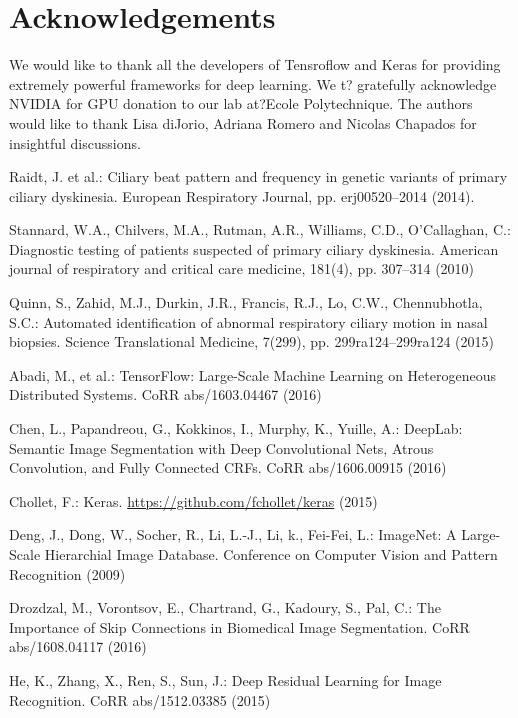 \documentclass{llncs}
\begin{document}
\section*{Acknowledgements}
We would like to thank all the developers of Tensroflow and Keras for providing extremely powerful  frameworks for deep learning.  We  t? gratefully  acknowledge  NVIDIA  for  GPU  donation to  our  lab  at?Ecole  Polytechnique.  The  authors  would  like  to  thank  Lisa  diJorio,  Adriana  Romero  and  Nicolas  Chapados  for  insightful  discussions.  

\begin{thebibliography}{26}

Raidt, J. et al.:
Ciliary beat pattern and frequency in genetic variants of primary ciliary dyskinesia.
European Respiratory Journal, pp. erj00520--2014 (2014).

Stannard, W.A., Chilvers, M.A., Rutman, A.R., Williams, C.D., O'Callaghan, C.:
Diagnostic testing of patients suspected of primary ciliary dyskinesia.
American journal of respiratory and critical care medicine, 181(4), pp. 307--314 (2010)

Quinn, S., Zahid, M.J., Durkin, J.R., Francis, R.J., Lo, C.W., Chennubhotla, S.C.:
Automated identification of abnormal respiratory ciliary motion in nasal biopsies.
Science Translational Medicine, 7(299), pp. 299ra124--299ra124 (2015)

Abadi, M., et al.:
TensorFlow: Large-Scale Machine Learning on Heterogeneous Distributed Systems.
CoRR abs/1603.04467 (2016)

Chen, L., Papandreou, G., Kokkinos, I., Murphy, K., Yuille, A.:
DeepLab: Semantic Image Segmentation with Deep Convolutional Nets, Atrous Convolution, and Fully Connected CRFs.
CoRR abs/1606.00915 (2016)

Chollet, F.:
Keras.
\url{https://github.com/fchollet/keras} (2015)

Deng, J., Dong, W., Socher, R., Li, L.-J., Li, k., Fei-Fei, L.:
ImageNet: A Large-Scale Hierarchial Image Database.
Conference on Computer Vision and Pattern Recognition (2009)

Drozdzal, M., Vorontsov, E., Chartrand, G., Kadoury, S., Pal, C.:
The Importance of Skip Connections in Biomedical Image Segmentation.
CoRR abs/1608.04117 (2016)

He, K., Zhang, X., Ren, S., Sun, J.:
Deep Residual Learning for Image Recognition.
CoRR abs/1512.03385 (2015)


\end{thebibliography}
\end{document}

